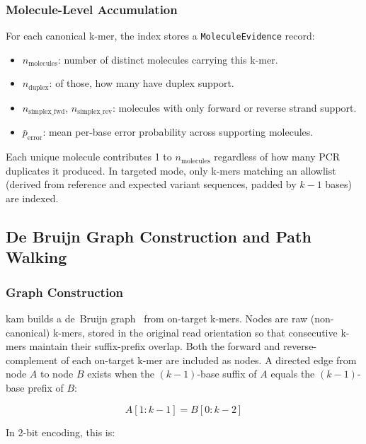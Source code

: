 \subsubsection{Molecule-Level Accumulation}

For each canonical k-mer, the index stores a \texttt{MoleculeEvidence} record:

\begin{itemize}
  \item $n_\text{molecules}$: number of distinct molecules carrying this k-mer.
  \item $n_\text{duplex}$: of those, how many have duplex support.
  \item $n_\text{simplex\_fwd}$, $n_\text{simplex\_rev}$: molecules with only forward or reverse strand support.
  \item $\bar{p}_\text{error}$: mean per-base error probability across supporting molecules.
\end{itemize}

Each unique molecule contributes 1 to $n_\text{molecules}$ regardless of how many PCR duplicates it produced.
In targeted mode, only k-mers matching an allowlist (derived from reference and expected variant sequences, padded by $k-1$ bases) are indexed.

\subsection{De Bruijn Graph Construction and Path Walking}
\label{sec:method:pathfind}

\subsubsection{Graph Construction}

kam builds a de~Bruijn graph~\autocite{Iqbal12cortex} from on-target k-mers.
Nodes are raw (non-canonical) k-mers, stored in the original read orientation so that consecutive k-mers maintain their suffix-prefix overlap.
Both the forward and reverse-complement of each on-target k-mer are included as nodes.
A directed edge from node $A$ to node $B$ exists when the $(k{-}1)$-base suffix of $A$ equals the $(k{-}1)$-base prefix of $B$:

\begin{equation}
  \label{eq:edge-condition}
  A[1{:}k{-}1] = B[0{:}k{-}2]
\end{equation}

In 2-bit encoding, this is:


